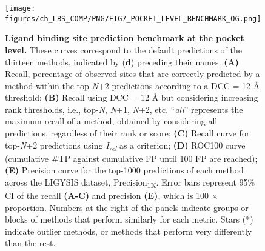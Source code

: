 \begin{figure}[ht!]
    \centering
    \texttt{[image: figures/ch\_LBS\_COMP/PNG/FIG7\_POCKET\_LEVEL\_BENCHMARK\_OG.png]}
    \caption[Ligand binding site prediction benchmark at the pocket level]{\textbf{Ligand binding site prediction benchmark at the pocket level.} These curves correspond to the default predictions of the thirteen methods,
indicated by (\textbf{d}) preceding their names. \textbf{(A)} Recall, percentage of observed sites that are correctly predicted by a method within the top-\textit{N}+2 predictions according to a DCC = 12 \AA{} threshold; \textbf{(B)} Recall using DCC = 12 \AA{} but considering increasing rank thresholds, i.e., top-\textit{N}, \textit{N}+1, \textit{N}+2, etc. ``\textit{all}'' represents the maximum recall of a method, obtained by considering all predictions, regardless of their rank or score; \textbf{(C)} Recall curve for top-\textit{N}+2 predictions using \textit{I\textsubscript{rel}} as a criterion; \textbf{(D)} ROC100 curve (cumulative \#TP against cumulative FP until 100 FP are reached); \textbf{(E)} Precision curve for the top-1000 predictions of each method across the LIGYSIS dataset, Precision\textsubscript{1K}. Error bars represent 95\% CI of the recall \textbf{(A-C)} and precision \textbf{(E)}, which is 100 $\times$ proportion. Numbers at the right of the panels indicate groups or blocks of methods that perform similarly for each metric. Stars (*) indicate outlier methods, or methods that perform very differently than the rest.}
    \label{fig:pocket_level_benchmark_OG}
\end{figure}

